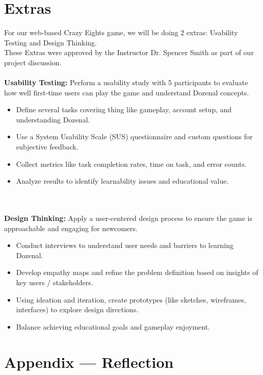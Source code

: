 \documentclass{article}
\begin{document}
    \section{Extras}
    For our web-based Crazy Eights game, we will be doing 2 extras: Usability Testing and Design Thinking.\\
    These Extras were approved by the Instructor Dr. Spencer Smith as part of our project discussion.
    \\\\
    \textbf{Usability Testing:} Perform a usability study with 5 participants to evaluate how well first-time users can play the game and understand Dozenal concepts.
    \begin{itemize}
        \item Define several tasks covering thing like gameplay, account setup, and understanding Dozenal.
        \item Use a System Usability Scale (SUS) questionnaire and custom questions for subjective feedback.
        \item Collect metrics like task completion rates, time on task, and error counts.
        \item Analyze results to identify learnability issues and educational value.
    \end{itemize}\\
    \\
    \textbf{Design Thinking:} Apply a user-centered design process to ensure the game is approachable and engaging for newcomers.
    \begin{itemize}
        \item Conduct interviews to understand user needs and barriers to learning Dozenal.
        \item Develop empathy maps and refine the problem definition based on insights of key users / stakeholders.
        \item Using ideation and iteration, create prototypes (like sketches, wireframes, interfaces) to explore design directions.
        \item Balance achieving educational goals and gameplay enjoyment.
    \end{itemize} 


    \newpage{}
    \section*{Appendix --- Reflection}
\end{document}
